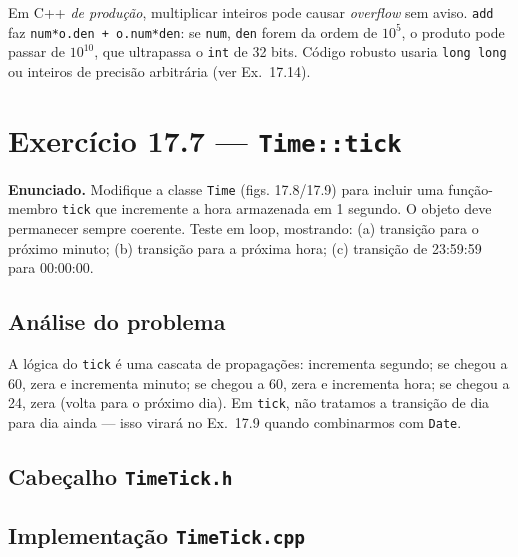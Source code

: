 \documentclass[11pt,a4paper]{article}
\begin{document}
\begin{errocomum}
Em C++ \emph{de produ\c{c}\~ao}, multiplicar inteiros pode causar \emph{overflow} sem aviso. \texttt{add} faz \texttt{num*o.den + o.num*den}: se \texttt{num}, \texttt{den} forem da ordem de $10^5$, o produto pode passar de $10^{10}$, que ultrapassa o \texttt{int} de 32 bits. C\'odigo robusto usaria \texttt{long long} ou inteiros de precis\~ao arbitr\'aria (ver Ex.~17.14).
\end{errocomum}

\newpage
\section{Exerc\'icio 17.7 --- \texttt{Time::tick}}

\begin{enunciado}
\textbf{Enunciado.} Modifique a classe \texttt{Time} (figs. 17.8/17.9) para incluir uma fun\c{c}\~ao-membro \texttt{tick} que incremente a hora armazenada em 1 segundo. O objeto deve permanecer sempre coerente. Teste em loop, mostrando: (a) transi\c{c}\~ao para o pr\'oximo minuto; (b) transi\c{c}\~ao para a pr\'oxima hora; (c) transi\c{c}\~ao de 23:59:59 para 00:00:00.
\end{enunciado}

\subsection*{An\'alise do problema}

A l\'ogica do \texttt{tick} \'e uma cascata de propaga\c{c}\~oes: incrementa segundo; se chegou a 60, zera e incrementa minuto; se chegou a 60, zera e incrementa hora; se chegou a 24, zera (volta para o pr\'oximo dia). Em \texttt{tick}, n\~ao tratamos a transi\c{c}\~ao de dia para dia ainda --- isso virar\'a no Ex.~17.9 quando combinarmos com \texttt{Date}.

\subsection*{Cabe\c{c}alho \texttt{TimeTick.h}}



\subsection*{Implementa\c{c}\~ao \texttt{TimeTick.cpp}}
\end{document}
